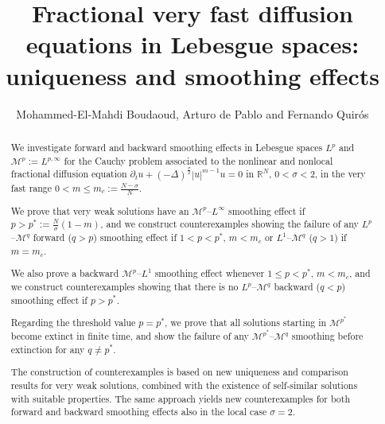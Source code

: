 \documentclass[leqno,12pt]{amsart}
\theoremstyle{definition}
\theoremstyle{remark}
\numberwithin{equation}{section}
\begin{document}
\title[Smoothing effects for fractional fast diffusion equations]{Fractional very fast diffusion equations in Lebesgue spaces: uniqueness and smoothing effects}
\author[M.-E.-M. Boudaoud, A. de Pablo \& F. Quirós]{Mohammed-El-Mahdi Boudaoud, Arturo de Pablo and Fernando Quir\'os}
\address{M.-E.-M. Boudaoud.
         Departamento  de Matem\'{a}ticas, Universidad Aut\'{o}noma de Madrid, 28049-Madrid, Spain.} 

\address{A. De Pablo.
        Departamento de Matem\'{a}ticas, Universidad Carlos III de Madrid, 28911-Legan\'{e}s, Spain \& Instituto de Ciencias Matem\'aticas ICMAT (CSIC-UAM-UC3M-UCM), 28049-Madrid, Spain.}

\address{F. Quir\'os.
        Departamento de Matem\'{a}ticas, Universidad Aut\'onoma de Madrid,
        \& Instituto de Ciencias Matem\'{a}ticas ICMAT (CSIC-UAM-UCM-UC3M),
        28049-Madrid, Spain.}

\date{}


\begin{abstract}
We investigate forward and backward smoothing effects in Lebesgue spaces $L^p$ and $\mathcal{M}^p:=L^{p,\infty}$ for the Cauchy problem associated to the nonlinear and nonlocal fractional diffusion equation $\partial_t u+(-\Delta)^{\frac\sigma2}|u|^{m-1}u=0$ in $\mathbb{R}^N$, $0<\sigma<2$, in the very fast range $0<m\le m_c:=\frac{N-\sigma}{N}$.

We prove that very weak solutions have an $\mathcal{M}^p$--$L^\infty$ smoothing effect if $p>p^*:=\frac{N}{\sigma}(1-m)$, and we construct counterexamples showing the failure of any $L^p$--$\mathcal{M}^q$ forward ($q>p$) smoothing effect if $1< p< p^*$, $m<m_c$ or $L^1$--$\mathcal{M}^q$ ($q>1$) if $m=m_c$.

We also prove a backward $\mathcal{M}^p$--$L^1$ smoothing effect whenever $1\le p<p^*$, $m<m_c$, and we construct counterexamples showing that there is no $L^p$--$\mathcal{M}^q$ backward ($q<p$) smoothing effect if $p> p^*$.

Regarding the threshold value $p=p^*$, we prove that all solutions starting in $\mathcal{M}^{p^*}$ become extinct in finite time, and show the failure of any $\mathcal{M}^{p^*}$--$\mathcal{M}^q$ smoothing before extinction for any $q\neq p^*$.

The construction of counterexamples is based on new uniqueness and comparison results for very weak solutions, combined with the existence of self-similar solutions with suitable properties. The same approach yields new counterexamples for both forward and backward smoothing effects also in the local case $\sigma=2$.
\end{abstract}
\end{document}
